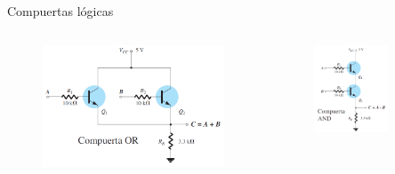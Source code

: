 \documentclass[t,aspectratio=169]{beamer}
\begin{document}
\begin{frame}{Compuertas lógicas}

\begin{columns}

\begin{column}{0.5\textwidth}

\begin{figure}[H]
    \centering
    \includegraphics[width=\textwidth]{figuras/aplicaciones_7_compuertas.png}
\end{figure}

\end{column}

\begin{column}{0.5\textwidth}

\begin{figure}[H]
    \centering
    \includegraphics[width=0.7\textwidth]{figuras/aplicaciones_8_compuertas.png}
\end{figure}

\end{column}

\end{columns}

\end{frame}
\end{document}
